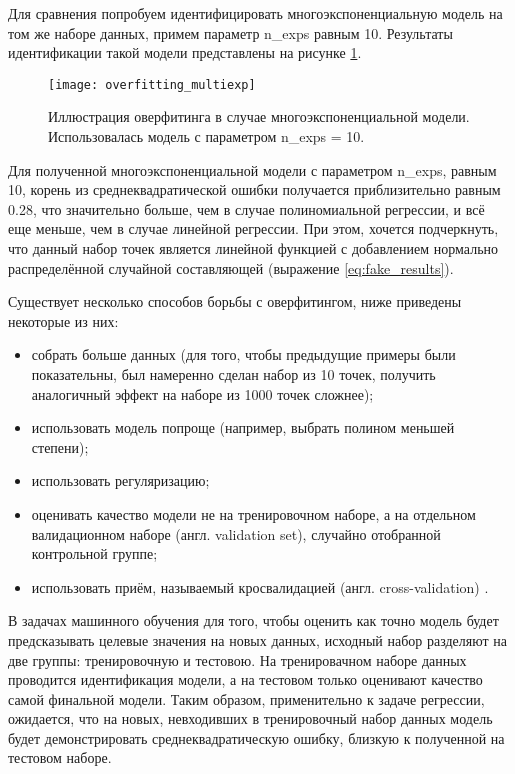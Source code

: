     Для сравнения попробуем идентифицировать многоэкспоненциальную модель на 
    том же наборе данных, примем параметр n\_exps равным 10. Результаты 
    идентификации такой модели представлены на рисунке 
    \ref{pic:overfitting_multiexp}.

    \begin{figure}[!htp]
        \centering
        \texttt{[image: overfitting\_multiexp]}
        \caption{Иллюстрация оверфитинга в случае многоэкспоненциальной модели.
                 Использовалась модель с параметром n\_exps = 10.}
        \label{pic:overfitting_multiexp}
    \end{figure}

    Для полученной многоэкспоненциальной модели с параметром n\_exps, равным 10,
    корень из среднеквадратической ошибки получается приблизительно равным 0.28,
    что значительно больше, чем в случае полиномиальной регрессии, и всё еще 
    меньше, чем в случае линейной регрессии. При этом, хочется подчеркнуть, что
    данный набор точек является линейной функцией с добавлением нормально
    распределённой случайной составляющей (выражение \ref{eq:fake_results}).

    Существует несколько способов борьбы с оверфитингом, ниже приведены некоторые
    из них:
    \begin{itemize}
    	\item собрать больше данных (для того, чтобы предыдущие примеры были 
    	показательны, был намеренно сделан набор из 10 точек, получить аналогичный
    	эффект на наборе из 1000 точек сложнее);
    	\item использовать модель попроще (например, выбрать полином меньшей 
    	степени);
    	\item использовать регуляризацию;
    	\item оценивать качество модели не на тренировочном наборе, а на отдельном
    	валидационном наборе (англ. validation set), случайно отобранной 
    	контрольной группе;
    	\item использовать приём, называемый кросвалидацией (англ. 
    	cross-validation) \cite{hands_on_ml, sklearn_cross_validation}.
    \end{itemize}

    В задачах машинного обучения для того, чтобы оценить как точно модель 
    будет предсказывать целевые значения на новых данных, исходный набор 
    разделяют на две группы: тренировочную и тестовою. На тренировачном наборе
    данных проводится идентификация модели, а на тестовом только оценивают 
    качество самой финальной модели. Таким образом, применительно к задаче 
    регрессии, ожидается, что на новых, невходивших в тренировочный набор данных
    модель будет демонстрировать среднеквадратическую ошибку, близкую к 
    полученной на тестовом наборе.

